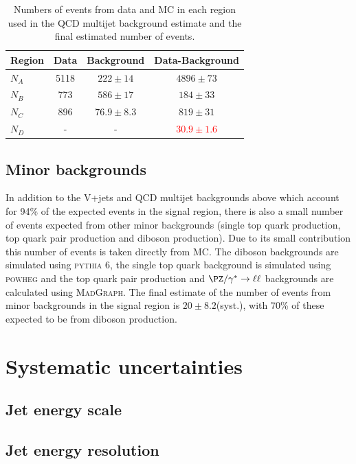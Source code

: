 \begin{table}
  \caption{Numbers of events from data and \ac{MC} in each region used in the \ac{QCD} multijet background estimate and the final estimated number of events.}
  \label{tab:promptqcd}
  \begin{tabular}{lccc}
    \hline
    \hline
    Region & Data & Background & Data-Background \\
    \hline
    \hline
    $N_{A}$ & 5118 & $222\pm 14$ & $4896\pm 73$\\
    $N_{B}$ & 773  & $586\pm 17$ & $184 \pm 33$\\
    $N_{C}$ & 896  & $76.9\pm 8.3$ & $819\pm 31$\\
    \hline
    $N_{D}$ & - & - & \textcolor{red}{$30.9\pm 1.6$}\\
    \hline
    \hline
  \end{tabular}
\end{table}

\subsection{Minor backgrounds}
\label{sec:promptminor}
In addition to the V+jets and QCD multijet backgrounds above which account for 94\% of the expected events in the signal region, there is also a small number of events expected from other minor backgrounds (single top quark production, top quark pair production and diboson production). Due to its small contribution this number of events is taken directly from \ac{MC}. The diboson backgrounds are simulated using \textsc{pythia 6}, the single top quark background is simulated using \textsc{powheg} and the top quark pair production and $\PZ/\gamma^{*}\rightarrow\ell\ell$ backgrounds are calculated using \textsc{MadGraph}. The final estimate of the number of events from minor backgrounds in the signal region is $20\pm 8.2$(syst.), with 70\% of these expected to be from diboson production.


\section{Systematic uncertainties}%
\label{sec:promptsyst}
\subsection{Jet energy scale}%
\label{sec:promptjes}

\subsection{Jet energy resolution}%
\label{sec:promptjer}

